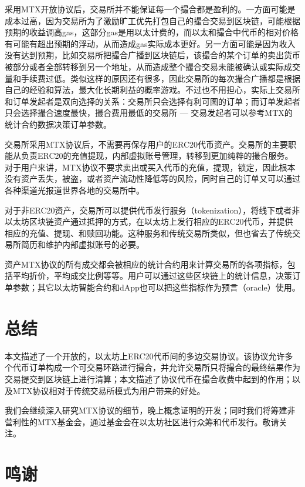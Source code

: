 \documentclass[UTF8,nofonts]{ctexart}
\begin{document}
采用MTX开放协议后，交易所并不能保证每一个撮合都是盈利的。一方面可能是成本过高，因为交易所为了激励旷工优先打包自己的撮合交易到区块链，可能根据预期的收益调高gas，这部分gas是用以太计费的，而以太和撮合中代币的相对价格有可能有超出预期的浮动，从而造成gas实际成本更好。另一方面可能是因为收入没有达到预期，比如交易所把撮合广播到区块链后，该撮合的某个订单的卖出货币被部分或者全部转移到另一个地址，从而造成整个撮合交易未能被确认或实际成交量和手续费过低。类似这样的原因还有很多，因此交易所的每次撮合广播都是根据自己的经验和算法，最大化长期利益的概率游戏。不过也不用担心，实际上交易所和订单发起者是双向选择的关系：交易所只会选择有利可图的订单；而订单发起者只会选择撮合速度最快，撮合费用最低的交易所 --- 交易发起者可以参考MTX的统计合约数据决策订单参数。

交易所采用MTX协议后，不需要再保存用户的ERC20代币资产。交易所的主要职能从负责ERC20的充值提现，内部虚拟账号管理，转移到更加纯粹的撮合服务。对于用户来讲，MTX协议不要求卖出或买入代币的充值，提现，锁定，因此根本没有资产丢失，被盗，或者资产流动性降低等的风险，同时自己的订单又可以通过各种渠道光报道世界各地的交易所中。

对于非ERC20资产，交易所可以提供代币发行服务（tokenization），将线下或者非以太坊区块链资产通过抵押的方式，在以太坊上发行相应的ERC20代币，并提供相应的充值、提现、和赎回功能。这种服务和传统交易所类似，但也省去了传统交易所简历和维护内部虚拟账号的必要。

资产MTX协议的所有成交都会被相应的统计合约用来计算交易所的各项指标，包括平均折价，平均成交比例等等。用户可以通过这些区块链上的统计信息，决策订单参数；其它以太坊智能合约和dApp也可以把这些指标作为预言（oracle）使用。

\section{总结\label{sec:summary}}

本文描述了一个开放的，以太坊上ERC20代币间的多边交易协议。该协议允许多个代币订单构成一个可交易环路进行撮合，并允许交易所只将撮合的最终结果作为交易提交到区块链上进行清算；本文描述了协议代币在撮合收费中起到的作用；以及MTX协议相对于传统交易所模式为用户带来的好处。

我们会继续深入研究MTX协议的细节，晚上概念证明的开发；同时我们将筹建非营利性的MTX基金会，通过基金会在以太坊社区进行众筹和代币发行。敬请关注。

\section{鸣谢\label{sec:acknowledgement}}
\end{document}
